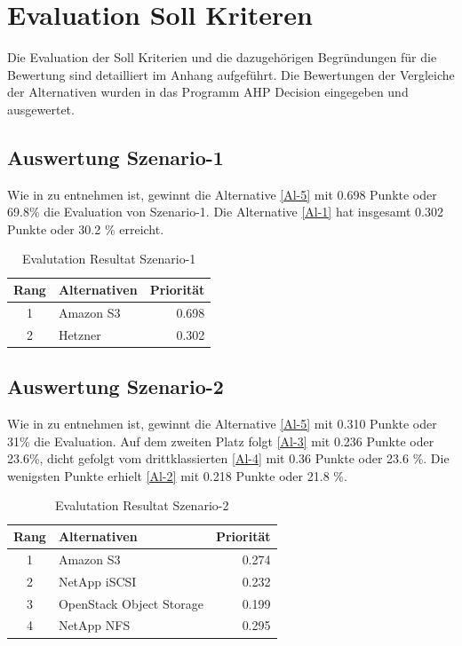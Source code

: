 \section{Evaluation Soll Kriteren}
Die Evaluation der Soll Kriterien und die dazugehörigen Begründungen für die Bewertung sind detailliert im Anhang aufgeführt. Die Bewertungen der Vergleiche der Alternativen wurden in das Programm AHP Decision eingegeben und ausgewertet.

\subsection{Auswertung Szenario-1}

Wie in  zu entnehmen ist, gewinnt die Alternative  \ref{Al-5} mit 0.698 Punkte oder 69.8\% die Evaluation von Szenario-1. Die Alternative  \ref{Al-1} hat insgesamt 0.302 Punkte oder 30.2 \% erreicht.

\begin{table}[htbp]
\caption{Evalutation Resultat Szenario-1}
\begin{center}
\begin{tabular}{|c|l|r|}
\hline
Rang & Alternativen & \multicolumn{1}{l|}{Priorität} \\ \hline
1 & Amazon S3 & 0.698 \\ \hline
2 & Hetzner & 0.302 \\ \hline
\end{tabular}
\end{center}
\label{EvalResultS1}
\end{table}


\subsection{Auswertung Szenario-2}

Wie in  zu entnehmen ist, gewinnt die Alternative  \ref{Al-5} mit 0.310 Punkte oder 31\% die Evaluation. Auf dem zweiten Platz folgt  \ref{Al-3} mit 0.236 Punkte oder 23.6\%, dicht gefolgt vom drittklassierten  \ref{Al-4} mit 0.36 Punkte oder 23.6 \%. Die wenigsten Punkte erhielt  \ref{Al-2} mit 0.218 Punkte oder 21.8 \%.

\begin{table}[htbp]
\caption{Evalutation Resultat Szenario-2}
\begin{center}
\begin{tabular}{|c|l|r|}
\hline
Rang &Alternativen & \multicolumn{1}{l|}{Priorität} \\ \hline
1 & Amazon S3 & 0.274 \\ \hline
2 & NetApp iSCSI & 0.232 \\ \hline
3 & OpenStack Object Storage & 0.199 \\ \hline
4 & NetApp NFS & 0.295\\ \hline
\end{tabular}
\end{center}
\label{EvalResultS2}
\end{table}

